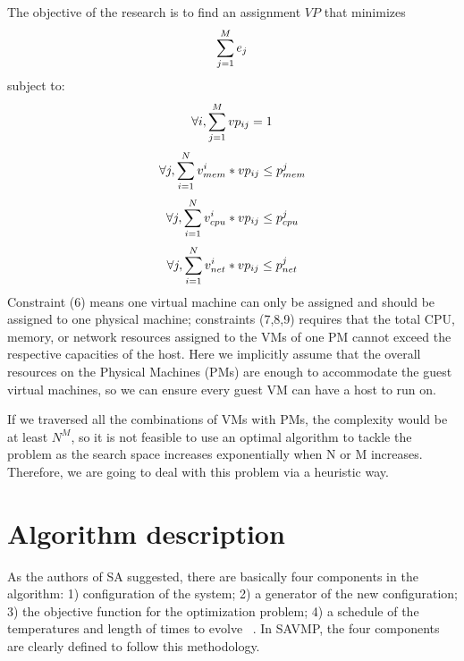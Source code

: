 \documentclass[10pt, conference, compsocconf]{IEEEtran}
\begin{document}
 The objective of the research is to find an assignment $VP$ that minimizes \\
\begin{equation}\label{5}
\sum_{j=1}^Me_j  \\
\end{equation}
subject to: \\
\begin{equation}\label{6}
\forall i,\sum_{j=1}^Mvp_{ij}=1  \\
\end{equation}
\begin{equation}\label{7}
\forall j, \sum_{i=1}^Nv_{mem}^i*vp_{ij}\leq p_{mem}^j \\
\end{equation}
\begin{equation}\label{8}
\forall j, \sum_{i=1}^Nv_{cpu}^i*vp_{ij}\leq p_{cpu}^j \\
\end{equation}
\begin{equation}\label{9}
\forall j, \sum_{i=1}^Nv_{net}^i*vp_{ij}\leq p_{net}^j \\
\end{equation}
Constraint (6) means one virtual machine can only be assigned and should be
assigned to one physical machine; constraints (7,8,9) requires that the total
CPU, memory, or network resources assigned to the VMs of one PM cannot exceed
the respective capacities of the host. Here we implicitly assume that the
overall resources on the Physical Machines (PMs) are enough to accommodate the
guest virtual machines, so we can ensure every guest VM can
have a host to run on.

If we traversed all the combinations of VMs with PMs, the complexity would be at
least $N^M$, so it is not feasible to use an optimal algorithm to tackle the
problem as the search space increases exponentially when N or M increases.
Therefore, we are going to deal with this problem via a heuristic way.

\section{Algorithm description}

As the authors of SA suggested, there are basically four components in the
algorithm: 1) configuration of the system; 2) a generator of the new
configuration; 3) the objective function for the optimization problem; 4) a
schedule of the temperatures and length of times to evolve
~\cite{kirkpatrick83}. In SAVMP, the four components are clearly defined to
follow this methodology.
\end{document}
